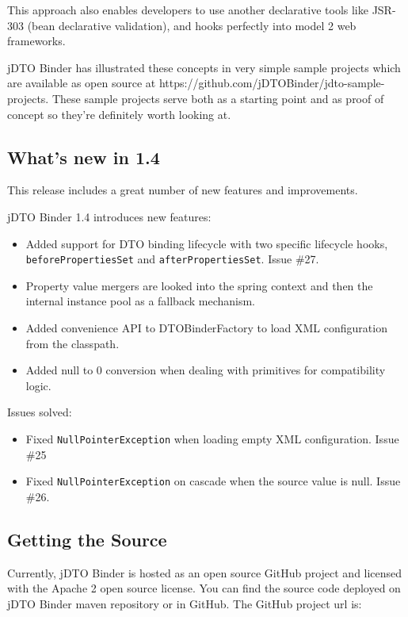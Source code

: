 \documentclass[11pt]{article}
\newcommand{\JDTO}{jDTO Binder\xspace}
\newcommand{\JDV}{1.4\xspace}
\begin{document}
This approach also enables developers to use another declarative tools like JSR-303 (bean declarative validation), and hooks perfectly into model 2 web frameworks.

\JDTO has illustrated these concepts in very simple sample projects which are available as open source at https://github.com/jDTOBinder/jdto-sample-projects. These sample projects serve both as a starting point and as proof of concept so they're definitely worth looking at.

\subsection{What's new in \JDV}

This release includes a great number of new features and improvements.

\JDTO \JDV introduces new features:
\begin{itemize}

\item Added support for DTO binding lifecycle with two specific lifecycle hooks, \texttt{beforePropertiesSet} and \texttt{afterPropertiesSet}. Issue \#27.
\item Property value mergers are looked into the spring context and then the internal instance pool as a fallback mechanism.
\item Added convenience API to DTOBinderFactory to load XML configuration from the classpath.
\item Added null to 0 conversion when dealing with primitives for compatibility logic.

\end{itemize}

Issues solved:

\begin{itemize}

\item Fixed \texttt{NullPointerException} when loading empty XML configuration. Issue \#25
\item Fixed \texttt{NullPointerException} on cascade when the source value is null. Issue \#26.

\end{itemize}

\subsection{Getting the Source}

Currently, \JDTO is hosted as an open source GitHub project and licensed with the Apache 2 open source license. You can find the source code deployed on \JDTO maven repository or in GitHub. The GitHub project url is: 
\end{document}
